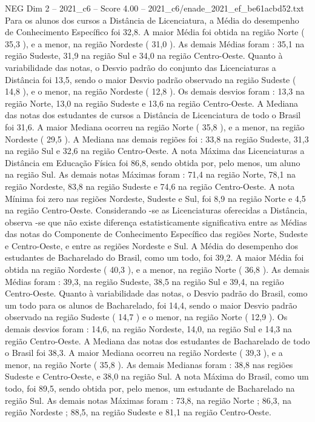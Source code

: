 \begin{textsample}{NEG Dim 2 – 2021\_c6 – Score 4.00 – 2021\_c6/enade\_2021\_ef\_be61acbd52.txt}
Para os alunos dos cursos a Distância de Licenciatura, a Média do desempenho de Conhecimento Específico foi 32,8.
A maior Média foi obtida na região Norte ( 35,3 ), e a menor, na região Nordeste ( 31,0 ).
As demais Médias foram : 35,1 na região Sudeste, 31,9 na região Sul e 34,0 na região Centro-Oeste.
Quanto à variabilidade das notas, o Desvio padrão do conjunto das Licenciaturas a Distância foi 13,5, sendo o maior Desvio padrão observado na região Sudeste ( 14,8 ), e o menor, na região Nordeste ( 12,8 ).
Os demais desvios foram : 13,3 na região Norte, 13,0 na região Sudeste e 13,6 na região Centro-Oeste.
A Mediana das notas dos estudantes de cursos a Distância de Licenciatura de todo o Brasil foi 31,6.
A maior Mediana ocorreu na região Norte ( 35,8 ), e a menor, na região Nordeste ( 29,5 ).
A Mediana nas demais regiões foi : 33,8 na região Sudeste, 31,3 na região Sul e 32,6 na região Centro-Oeste.
A nota Máxima das Licenciaturas a Distância em Educação Física foi 86,8, sendo obtida por, pelo menos, um aluno na região Sul.
As demais notas Máximas foram : 71,4 na região Norte, 78,1 na região Nordeste, 83,8 na região Sudeste e 74,6 na região Centro-Oeste.
A nota Mínima foi zero nas regiões Nordeste, Sudeste e Sul, foi 8,9 na região Norte e 4,5 na região Centro-Oeste.
Considerando -se as Licenciaturas oferecidas a Distância, observa -se que não existe diferença estatisticamente significativa entre as Médias das notas do Componente de Conhecimento Específico das regiões Norte, Sudeste e Centro-Oeste, e entre as regiões Nordeste e Sul.
A Média do desempenho dos estudantes de Bacharelado do Brasil, como um todo, foi 39,2.
A maior Média foi obtida na região Nordeste ( 40,3 ), e a menor, na região Norte ( 36,8 ).
As demais Médias foram : 39,3, na região Sudeste, 38,5 na região Sul e 39,4, na região Centro-Oeste.
Quanto à variabilidade das notas, o Desvio padrão do Brasil, como um todo para os alunos de Bacharelado, foi 14,4, sendo o maior Desvio padrão observado na região Sudeste ( 14,7 ) e o menor, na região Norte ( 12,9 ).
Os demais desvios foram : 14,6, na região Nordeste, 14,0, na região Sul e 14,3 na região Centro-Oeste.
A Mediana das notas dos estudantes de Bacharelado de todo o Brasil foi 38,3.
A maior Mediana ocorreu na região Nordeste ( 39,3 ), e a menor, na região Norte ( 35,8 ).
As demais Medianas foram : 38,8 nas regiões Sudeste e Centro-Oeste, e 38,0 na região Sul.
A nota Máxima do Brasil, como um todo, foi 89,5, sendo obtida por, pelo menos, um estudante de Bacharelado na região Sul.
As demais notas Máximas foram : 73,8, na região Norte ; 86,3, na região Nordeste ; 88,5, na região Sudeste e 81,1 na região Centro-Oeste.

\end{textsample}
